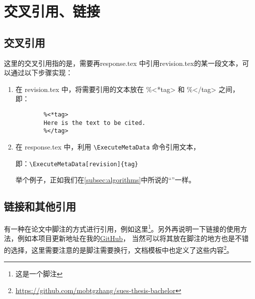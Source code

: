 \section{交叉引用、链接}
\subsection{交叉引用}
这里的交叉引用指的是，需要再response.tex 中引用revision.tex的某一段文本，可以通过以下步骤实现：

\begin{enumerate}[label=\arabic*]
    \item 在 revision.tex 中，将需要引用的文本放在 \%<*tag> 和 \%</tag> 之间，即：
    \begin{lstlisting}
        %<*tag>
        Here is the text to be cited.
        %</tag>
    \end{lstlisting}
    \item 在 response.tex 中，利用 \verb|\ExecuteMetaData| 命令引用文本，

    即：\verb|\ExecuteMetaData[revision]{tag}|

    举个例子，正如我们在\cref{subsec:algorithms}中所说的“”一样。
\end{enumerate}
\subsection{链接和其他引用}

有一种在论文中脚注的方式进行引用，例如这里\footnote{这是一个脚注}。另外再说明一下链接的使用方法，例如本项目更新地址在我的\href{https://github.com/mobtgzhang/sues-thesis-bachelor}{GitHub}，
当然可以将其放在脚注的地方也是不错的选择，这里需要注意的是脚注需要换行，文档模板中也定义了这些内容\footnote{\url{https://github.com/mobtgzhang/sues-thesis-bachelor}}。
